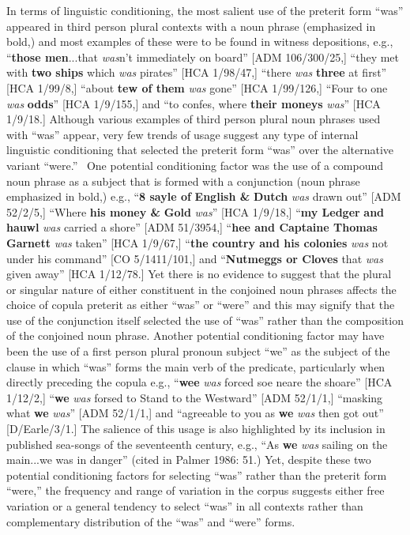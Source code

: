 \begin{styleStandard}
In terms of linguistic conditioning, the most salient use of the preterit form “was” appeared in third person plural contexts with a noun phrase (emphasized in bold,) and most examples of these were to be found in witness depositions, e.g., “\textbf{those men}...that \textit{was}n't immediately on board” [ADM 106/300/25,] “they met with \textbf{two ships} which \textit{was} pirates” [HCA 1/98/47,] “there \textit{was} \textbf{three} at first” [HCA 1/99/8,] “about \textbf{tew of them} \textit{was} gone” [HCA 1/99/126,] “Four to one \textit{was} \textbf{odds}” [HCA 1/9/155,] and “to confes, where \textbf{their moneys} \textit{was}” [HCA 1/9/18.] Although various examples of third person plural noun phrases used with “was” appear, very few trends of usage suggest any type of internal linguistic conditioning that selected the preterit form “was” over the alternative variant “were.” \ One potential conditioning factor was the use of a compound noun phrase as a subject that is formed with a conjunction (noun phrase emphasized in bold,) e.g., “\textbf{8 sayle of} \textbf{English \&} \textbf{Dutch} \textit{was} drawn out” [ADM 52/2/5,] “Where \textbf{his money \&} \textbf{Gold} \textit{was}” [HCA 1/9/18,] “\textbf{my Ledger} \textbf{and} \textbf{hauwl} \textit{was} carried a shore” [ADM 51/3954,] “\textbf{hee and Captaine Thomas Garnett }\textit{was} taken” [HCA 1/9/67,] “\textbf{the country and his colonies} \textit{was} not under his command” [CO 5/1411/101,] and “\textbf{Nutmeggs or Cloves} that \textit{was} given away” [HCA 1/12/78.] Yet there is no evidence to suggest that the plural or singular nature of either constituent in the conjoined noun phrases affects the choice of copula preterit as either “was” or “were” and this may signify that the use of the conjunction itself selected the use of “was” rather than the composition of the conjoined noun phrase. Another potential conditioning factor may have been the use of a first person plural pronoun subject “we” as the subject of the clause in which “was” forms the main verb of the predicate, particularly when directly preceding the copula e.g., “\textbf{wee} \textit{was} forced soe neare the shoare” [HCA 1/12/2,] “\textbf{we} \textit{was} forsed to Stand to the Westward” [ADM 52/1/1,] “masking what \textbf{we} \textit{was}” [ADM 52/1/1,] and “agreeable to you as \textbf{we }\textit{was} then got out” [D/Earle/3/1.] The salience of this usage is also highlighted by its inclusion in published sea-songs of the seventeenth century, e.g., “As \textbf{we }\textit{was} sailing on the main...we was in danger” (cited in Palmer 1986: 51.) Yet, despite these two potential conditioning factors for selecting “was” rather than the preterit form “were,” the frequency and range of variation in the corpus suggests either free variation or a general tendency to select “was” in all contexts rather than complementary distribution of the “was” and “were” forms. 
\end{styleStandard}

